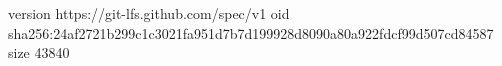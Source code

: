 version https://git-lfs.github.com/spec/v1
oid sha256:24af2721b299c1c3021fa951d7b7d199928d8090a80a922fdcf99d507cd84587
size 43840
